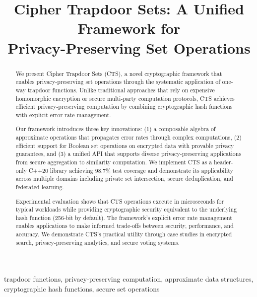 \documentclass[10pt,conference]{IEEEtran}
\begin{document}
\title{Cipher Trapdoor Sets: A Unified Framework for\\Privacy-Preserving Set Operations}

\author{
}

\maketitle

\begin{abstract}
We present Cipher Trapdoor Sets (CTS), a novel cryptographic framework that enables privacy-preserving set operations through the systematic application of one-way trapdoor functions. Unlike traditional approaches that rely on expensive homomorphic encryption or secure multi-party computation protocols, CTS achieves efficient privacy-preserving computation by combining cryptographic hash functions with explicit error rate management.

Our framework introduces three key innovations: (1) a composable algebra of approximate operations that propagates error rates through complex computations, (2) efficient support for Boolean set operations on encrypted data with provable privacy guarantees, and (3) a unified API that supports diverse privacy-preserving applications from secure aggregation to similarity computation. We implement CTS as a header-only C++20 library achieving 98.7\% test coverage and demonstrate its applicability across multiple domains including private set intersection, secure deduplication, and federated learning.

Experimental evaluation shows that CTS operations execute in microseconds for typical workloads while providing cryptographic security equivalent to the underlying hash function (256-bit by default). The framework's explicit error rate management enables applications to make informed trade-offs between security, performance, and accuracy. We demonstrate CTS's practical utility through case studies in encrypted search, privacy-preserving analytics, and secure voting systems.
\end{abstract}

\begin{IEEEkeywords}
trapdoor functions, privacy-preserving computation, approximate data structures, cryptographic hash functions, secure set operations
\end{IEEEkeywords}
\end{document}
